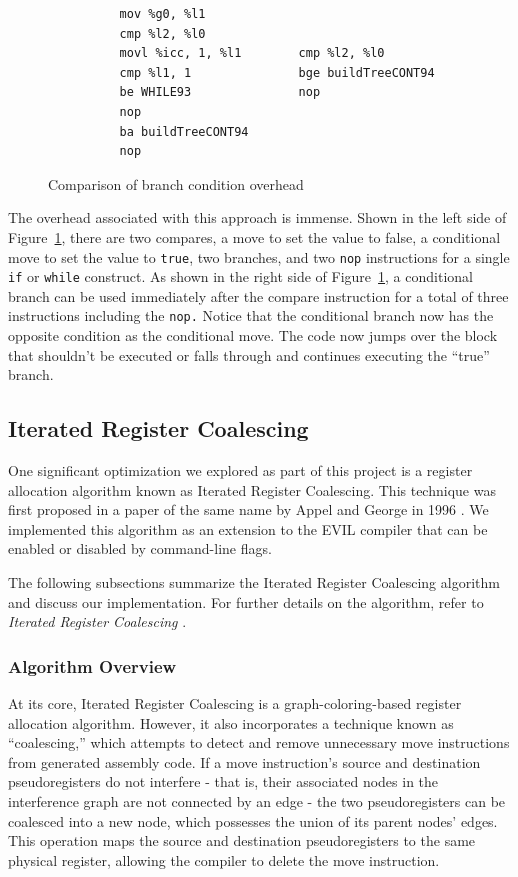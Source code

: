 \documentclass[12pt]{article}
\begin{document}
\begin{figure}
\begin{verbatim}
          mov %g0, %l1
          cmp %l2, %l0
          movl %icc, 1, %l1        cmp %l2, %l0
          cmp %l1, 1               bge buildTreeCONT94
          be WHILE93               nop
          nop
          ba buildTreeCONT94
          nop
\end{verbatim}
\caption{Comparison of branch condition overhead}
\label{fig:branchOverhead}
\end{figure}

The overhead associated with this approach is immense.
Shown in the left side of Figure~\ref{fig:branchOverhead}, there are two compares, a move to set the value to false, a conditional move to set the value to {\tt true}, two branches, and two {\tt nop} instructions for a single {\tt if} or {\tt while} construct.
As shown in the right side of Figure~\ref{fig:branchOverhead}, a conditional branch can be used immediately after the compare instruction for a total of three instructions including the {\tt nop.}
Notice that the conditional branch now has the opposite condition as the conditional move.
The code now jumps over the block that shouldn’t be executed or falls through and continues executing the ``true'' branch.

\subsection{Iterated Register Coalescing}
One significant optimization we explored as part of this project is a register allocation algorithm known as Iterated Register Coalescing.
This technique was first proposed in a paper of the same name by Appel and George in 1996 \cite{iteratedRegisterCoalescing}.
We implemented this algorithm as an extension to the EVIL compiler that can be enabled or disabled by command-line flags.

The following subsections summarize the Iterated Register Coalescing algorithm and discuss our implementation.
For further details on the algorithm, refer to \emph{Iterated Register Coalescing} \cite{iteratedRegisterCoalescing}.

\subsubsection{Algorithm Overview}

At its core, Iterated Register Coalescing is a graph-coloring-based register allocation algorithm.
However, it also incorporates a technique known as “coalescing,” which attempts to detect and remove unnecessary move instructions from generated assembly code.
If a move instruction's source and destination pseudoregisters do not interfere - that is, their associated nodes in the interference graph are not connected by an edge - the two pseudoregisters can be coalesced into a new node, which possesses the union of its parent nodes' edges.
This operation maps the source and destination pseudoregisters to the same physical register, allowing the compiler to delete the move instruction.
\end{document}
